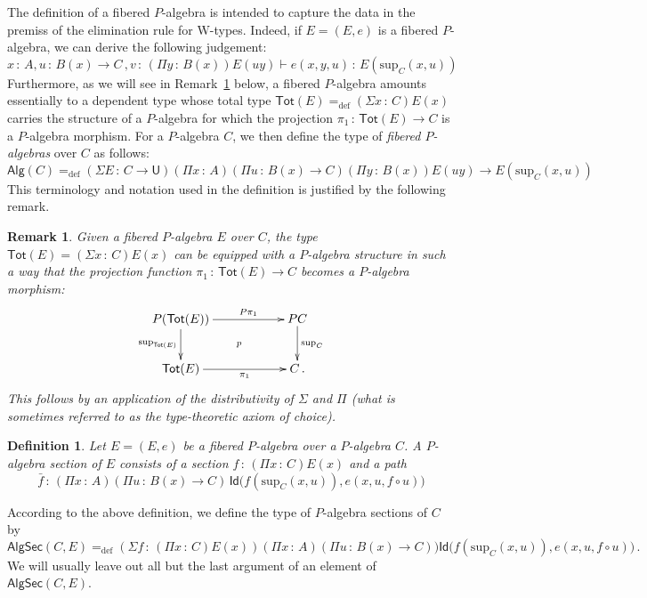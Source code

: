 \documentclass[10pt,a4paper,oneside,reqno]{amsart}
\numberwithin{equation}{section}
\theoremstyle{mythm}
\theoremstyle{mydef}
\newtheorem{definition}[theorem]{Definition}
\theoremstyle{myrmk}
\newtheorem{remark}[theorem]{Remark}
\newcommand{\ie}{\text{i.e.\ }}
\newcommand{\defeq}{=_{\mathrm{def}}}
\newcommand{\co}{\,{:}\,}
\newcommand{\Id}{\mathsf{Id}}
\newcommand{\W}{\mathrm{W}}
\newcommand{\U}{\mathsf{U}}
\newcommand{\Tot}{\mathsf{Tot}}
\newcommand{\Palg}{\mathsf{Alg}}
\renewcommand{\sup}{\mathrm{sup}}
\newcommand{\PalgSec}{\mathsf{AlgSec}}
\begin{document}
The definition of a fibered $P$-algebra is intended to capture the data in the premiss of the elimination 
rule for $\W$-types. Indeed, if $E = (E, e)$ is a fibered $P$-algebra, we can derive the following judgement:
\[
x \co A, u \co B(x) \to C \, , v \co (\Pi y \co B(x)) E(u y) \vdash e(x,y,u) \co E(\sup_C(x,u))
\]
Furthermore, as we will see in Remark~\ref{thm:fibalg} below, a fibered $P$-algebra amounts essentially to a dependent type whose total
type $\mathsf{Tot}(E) \defeq (\Sigma x \co C) E(x)$ carries the structure of a $P$-algebra for which the projection $\pi_1 \co \mathsf{Tot}(E) 
\to C$ is a $P$-algebra morphism.  For a $P$-algebra $C$, we then define the type of \emph{fibered $P$-algebras} over $C$ as follows:
\[
\Palg(C) \defeq (\Sigma E \co C \to \U) (\Pi x \co A) (\Pi u \co B(x) \to C) 
 (\Pi y \co B(x))  E(u y)  \to E(\sup_C(x,u))
 \]
This terminology and notation used in the definition is justified by the following remark.

\begin{remark}\label{thm:fibalg}
Given a fibered $P$-algebra $E$ over $C$, the type $\Tot(E) =  (\Sigma x \co  C) E(x)$ can be equipped with 
a $P$-algebra structure in such a way that  the projection function $\pi_1 \co \Tot(E) \to C$ becomes a $P$-algebra morphism:
\[
\xymatrix@C=2cm{
P(\Tot(E)) \ar[r]^-{P\pi_1} \ar[d]_-{\sup_{\Tot(E)}} \ar@{}[rd]|{p} & PC \ar[d]^{\sup_C} \\ 
\Tot(E)  \ar[r]_-{\pi_1} & C \, .}
 \]
 This follows by an application of the distributivity of $\Sigma$ and $\Pi$ (\ie what is sometimes
referred to as the type-theoretic axiom of choice). 
\end{remark}

\begin{definition} \label{def:fibalgsection} Let $E = (E, e)$ be a fibered $P$-algebra over a $P$-algebra $C$.  
A \emph{$P$-algebra section} of $E$ consists of a section $f \co (\Pi x \co C) E(x)$ and a path
\[ 
\bar{f} \co (\Pi x \co A) (\Pi u \co B(x) \to C) \, \Id \big( f(\sup_C(x,u)), e(x, u, f \circ u) \big)
\]
\end{definition} 

According to the above definition, we define the type of $P$-algebra sections of $C$ by
\[ 
\PalgSec(C,E)  \defeq (\Sigma f  \co (\Pi x \co C) E(x)) (\Pi x \co A) (\Pi u \co  B(x) \to C) ) 
\Id\big(   f(\sup_C(x,u)) ,  e(x,u,f  \circ u) \big) \, .
\]
We will usually leave out all but the last argument of an element of $\PalgSec(C,E)$. 
\end{document}
